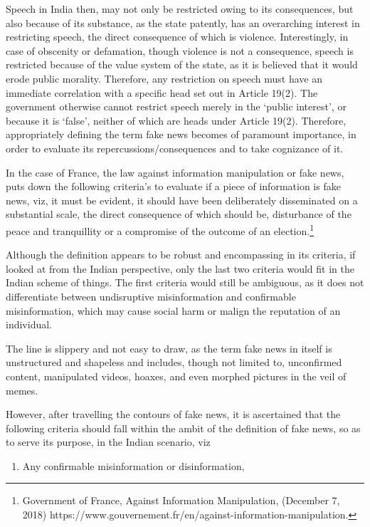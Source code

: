 \begin{multicols}{2}
Speech in India then, may not only be restricted owing to its consequences, but also because
of its substance, as the state patently, has an overarching interest in restricting speech, the
direct consequence of which is violence. Interestingly, in case of obscenity or defamation,
though violence is not a consequence, speech is restricted because of the value system of the
state, as it is believed that it would erode public morality. Therefore, any restriction on speech
must have an immediate correlation with a specific head set out in Article 19(2). The
government otherwise cannot restrict speech merely in the ‘public interest’, or because it is
‘false’, neither of which are heads under Article 19(2). Therefore, appropriately defining the
term fake news becomes of paramount importance, in order to evaluate its
repercussions/consequences and to take cognizance of it.

In the case of France, the law against information manipulation or fake news, puts down the
following criteria’s to evaluate if a piece of information is fake news, viz, it must be evident,
it should have been deliberately disseminated on a substantial scale, the direct consequence of
which should be, disturbance of the peace and tranquillity or a compromise of the outcome of
an election.\footnote{Government of France, Against Information Manipulation, (December 7, 2018)
https://www.gouvernement.fr/en/against-information-manipulation.}

Although the definition appears to be robust and encompassing in its criteria, if looked at
from the Indian perspective, only the last two criteria would fit in the Indian scheme of
things. The first criteria would still be ambiguous, as it does not differentiate between
undisruptive misinformation and confirmable misinformation, which may cause social harm
or malign the reputation of an individual.

The line is slippery and not easy to draw, as the term fake news in itself is unstructured and
shapeless and includes, though not limited to, unconfirmed content, manipulated videos,
hoaxes, and even morphed pictures in the veil of memes.

However, after travelling the contours of fake news, it is ascertained that the following criteria
should fall within the ambit of the definition of fake news, so as to serve its purpose, in the
Indian scenario, viz

\begin{enumerate}
\item Any confirmable misinformation or disinformation, 


\end{enumerate}
\end{multicols}

